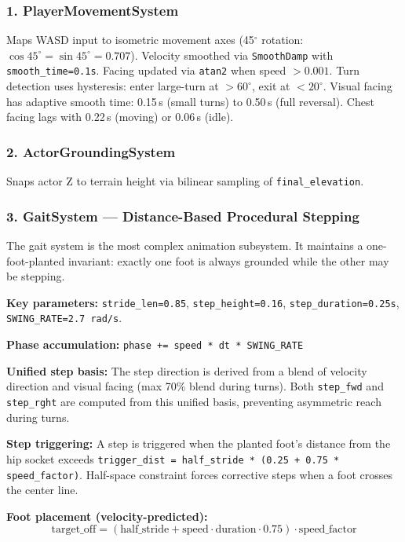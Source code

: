 \documentclass[11pt,a4paper]{article}
\begin{document}
\subsubsection{1. PlayerMovementSystem}

Maps WASD input to isometric movement axes (45$^\circ$ rotation: $\cos 45^\circ = \sin 45^\circ = 0.707$). Velocity smoothed via \texttt{SmoothDamp} with \texttt{smooth\_time=0.1s}. Facing updated via \texttt{atan2} when speed $> 0.001$. Turn detection uses hysteresis: enter large-turn at $>60^\circ$, exit at $<20^\circ$. Visual facing has adaptive smooth time: 0.15\,s (small turns) to 0.50\,s (full reversal). Chest facing lags with 0.22\,s (moving) or 0.06\,s (idle).

\subsubsection{2. ActorGroundingSystem}

Snaps actor Z to terrain height via bilinear sampling of \texttt{final\_elevation}.

\subsubsection{3. GaitSystem --- Distance-Based Procedural Stepping}

The gait system is the most complex animation subsystem. It maintains a one-foot-planted invariant: exactly one foot is always grounded while the other may be stepping.

\textbf{Key parameters:} \texttt{stride\_len=0.85}, \texttt{step\_height=0.16}, \texttt{step\_duration=0.25s}, \texttt{SWING\_RATE=2.7\,rad/s}.

\textbf{Phase accumulation:} \texttt{phase += speed * dt * SWING\_RATE}

\textbf{Unified step basis:} The step direction is derived from a blend of velocity direction and visual facing (max 70\% blend during turns). Both \texttt{step\_fwd} and \texttt{step\_rght} are computed from this unified basis, preventing asymmetric reach during turns.

\textbf{Step triggering:} A step is triggered when the planted foot's distance from the hip socket exceeds \texttt{trigger\_dist = half\_stride * (0.25 + 0.75 * speed\_factor)}. Half-space constraint forces corrective steps when a foot crosses the center line.

\textbf{Foot placement (velocity-predicted):}
\[\text{target\_off} = (\text{half\_stride} + \text{speed} \cdot \text{duration} \cdot 0.75) \cdot \text{speed\_factor}\]
\end{document}
